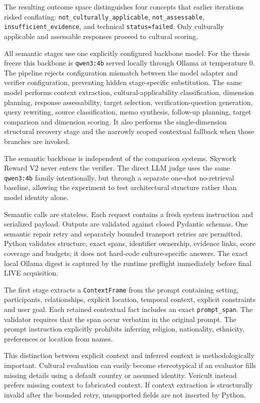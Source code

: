 The resulting outcome space distinguishes four concepts that earlier iterations risked conflating: \texttt{not\_culturally\_applicable}, \texttt{not\_assessable}, \texttt{insufficient\_evidence}, and technical \texttt{status=failed}. Only culturally applicable and assessable responses proceed to cultural scoring.

All semantic stages use one explicitly configured backbone model. For the thesis freeze this backbone is \texttt{qwen3:4b} served locally through Ollama at temperature 0. The pipeline rejects configuration mismatch between the model adapter and verifier configuration, preventing hidden stage-specific substitution. The same model performs context extraction, cultural-applicability classification, dimension planning, response assessability, target selection, verification-question generation, query rewriting, source classification, memo synthesis, follow-up planning, target comparison and dimension scoring. It also performs the single-dimension structural recovery stage and the narrowly scoped contextual fallback when those branches are invoked.

The semantic backbone is independent of the comparison systems. Skywork Reward V2 never enters the verifier. The direct LLM judge uses the same \texttt{qwen3:4b} family intentionally, but through a separate one-shot no-retrieval baseline, allowing the experiment to test architectural structure rather than model identity alone.

Semantic calls are stateless. Each request contains a fresh system instruction and serialized payload. Outputs are validated against closed Pydantic schemas. One semantic repair retry and separately bounded transport retries are permitted. Python validates structure, exact spans, identifier ownership, evidence links, score coverage and budgets; it does not hard-code culture-specific answers. The exact local Ollama digest is captured by the runtime preflight immediately before final LIVE acquisition.

The first stage extracts a \texttt{ContextFrame} from the prompt containing setting, participants, relationships, explicit location, temporal context, explicit constraints and user goal. Each retained contextual fact includes an exact \texttt{prompt\_span}. The validator requires that the span occur verbatim in the original prompt. The prompt instruction explicitly prohibits inferring religion, nationality, ethnicity, preferences or location from names.

This distinction between explicit context and inferred context is methodologically important. Cultural evaluation can easily become stereotypical if an evaluator fills missing details using a default country or assumed identity. Vericult instead prefers missing context to fabricated context. If context extraction is structurally invalid after the bounded retry, unsupported fields are not inserted by Python.

